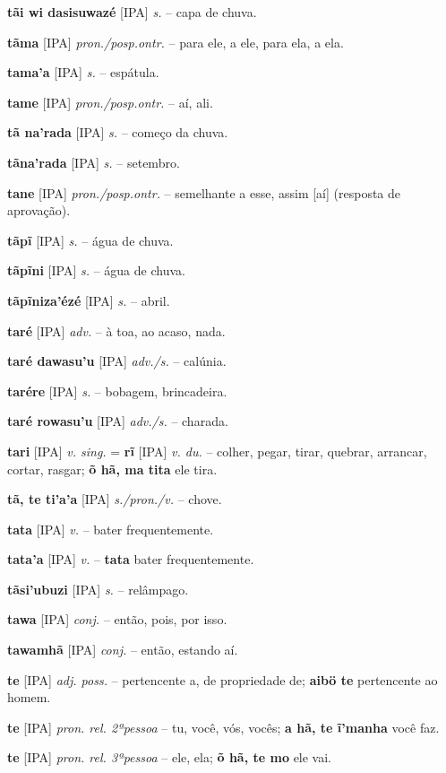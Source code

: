 \textbf{tãi wi dasisuwazé} [IPA] \textit{s.} -- capa de chuva.

\textbf{tãma} [IPA] \textit{pron./posp.ontr.} -- para ele, a ele, para ela, a ela.

\textbf{tama'a} [IPA] \textit{s.} -- espátula.

\textbf{tame} [IPA] \textit{pron./posp.ontr.} -- aí, ali.

\textbf{tã na'rada} [IPA] \textit{s.} -- começo da chuva.

\textbf{tãna'rada} [IPA] \textit{s.} -- setembro.

\textbf{tane} [IPA] \textit{pron./posp.ontr.} -- semelhante a esse, assim [aí] (resposta de aprovação).

\textbf{tãpĩ} [IPA] \textit{s.} -- água de chuva.

\textbf{tãpĩni} [IPA] \textit{s.} -- água de chuva.

\textbf{tãpĩniza'ézé} [IPA] \textit{s.} -- abril.

\textbf{taré} [IPA] \textit{adv.} -- à toa, ao acaso, nada.

\textbf{taré dawasu'u} [IPA] \textit{adv./s.} -- calúnia.

\textbf{tarére} [IPA] \textit{s.} -- bobagem, brincadeira.

\textbf{taré rowasu'u} [IPA] \textit{adv./s.} -- charada.

\textbf{tari} [IPA] \textit{v. sing.} = \textbf{rĩ} [IPA] \textit{v. du.} -- colher, pegar, tirar, quebrar, arrancar, cortar, rasgar; \textbf{õ hã, ma tita} ele tira.

\textbf{tã, te ti'a'a} [IPA] \textit{s./pron./v.} -- chove.

\textbf{tata} [IPA] \textit{v.} -- bater frequentemente.

\textbf{tata'a} [IPA] \textit{v.} -- \textbf{tata} bater frequentemente.

\textbf{tãsi'ubuzi} [IPA] \textit{s.} -- relâmpago.

\textbf{tawa} [IPA] \textit{conj.} -- então, pois, por isso.

\textbf{tawamhã} [IPA] \textit{conj.} -- então, estando aí.

\textbf{te} [IPA] \textit{adj. poss.} -- pertencente a, de propriedade de; \textbf{aibö te} pertencente ao homem.

\textbf{te} [IPA] \textit{pron. rel. 2ªpessoa} -- tu, você, vós, vocês; \textbf{a hã, te ĩ'manha} você faz.

\textbf{te} [IPA] \textit{pron. rel. 3ªpessoa} -- ele, ela; \textbf{õ hã, te mo} ele vai.

